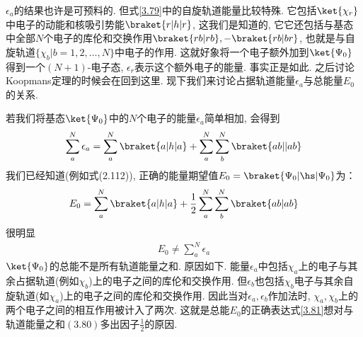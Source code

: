$\epsilon_a$的结果也许是可预料的. 但式\eqref{3.79}中的自旋轨道能量比较特殊. 它包括$\ket{\chi_r}$中电子的动能和核吸引势能$\braket{r|h|r}$, 这我们是知道的, 它它还包括与\hft 基态中全部$N$个电子的库伦和交换作用$\braket{rb|rb},-\braket{rb|br}$, 也就是与自旋轨道$\{\chi_b|b=1,2,\ldots,N\}$中电子的作用. 这就好象将一个电子额外加到$\ket{\Psi_0}$得到一个$(N+1)$-电子态, $\epsilon_r$表示这个额外电子的能量. 事实正是如此. 之后讨论Koopmans定理的时候会在回到这里. 现下我们来讨论占据轨道能量$\epsilon_a$与总能量$E_0$的关系.

若我们将基态$\ket{\Psi_0}$中的$N$个电子的能量$\epsilon_a$简单相加, 会得到
\begin{align}
\sum_{a}^{N}\epsilon_a = \sum_a^N\braket{a|h|a} + \sum_a^N\sum_b^N\braket{ab||ab}
\end{align}
我们已经知道(例如式(2.112)), 正确的能量期望值$E_0 = \braket{\Psi_0|\hs|\Psi_0}$为：
\begin{align}
\label{3.81}
E_0 = \sum_a^N\braket{a|h|a} + \frac{1}{2}\sum_a^N\sum_b^N\braket{ab|ab}
\end{align}
很明显
\begin{align}
E_0 \neq \sum_a^N \epsilon_a
\end{align}
$\ket{\Psi_0}$的总能不是所有轨道能量之和. 原因如下. 能量$\epsilon_a$中包括$\chi_a$上的电子与其余占据轨道(例如$\chi_b$)上的电子之间的库伦和交换作用. 但$\epsilon_b$也包括$\chi_b$电子与其余自旋轨道(如$\chi_a$)上的电子之间的库伦和交换作用. 因此当对$\epsilon_a,\epsilon_b$作加法时, $\chi_a,\chi_b$上的两个电子之间的相互作用被计入了两次. 这就是总能$E_0$的正确表达式\eqref{3.81}想对与轨道能量之和$(3.80)$多出因子$\frac{1}{2}$的原因.


